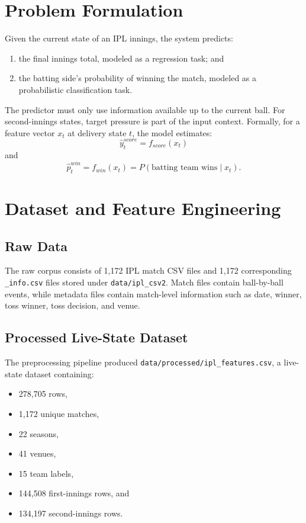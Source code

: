 \documentclass[conference]{IEEEtran}
\begin{document}
\section{Problem Formulation}
Given the current state of an IPL innings, the system predicts:
\begin{enumerate}
\item the final innings total, modeled as a regression task; and
\item the batting side's probability of winning the match, modeled as a probabilistic classification task.
\end{enumerate}

The predictor must only use information available up to the current ball. For second-innings states, target pressure is part of the input context. Formally, for a feature vector $x_t$ at delivery state $t$, the model estimates:
\begin{equation}
\hat{y}^{score}_t = f_{score}(x_t)
\end{equation}
and
\begin{equation}
\hat{p}^{win}_t = f_{win}(x_t) = P(\text{batting team wins} \mid x_t).
\end{equation}

\section{Dataset and Feature Engineering}
\subsection{Raw Data}
The raw corpus consists of 1,172 IPL match CSV files and 1,172 corresponding \texttt{\_info.csv} files stored under \texttt{data/ipl\_csv2}. Match files contain ball-by-ball events, while metadata files contain match-level information such as date, winner, toss winner, toss decision, and venue.

\subsection{Processed Live-State Dataset}
The preprocessing pipeline produced \texttt{data/processed/ipl\_features.csv}, a live-state dataset containing:
\begin{itemize}
\item 278,705 rows,
\item 1,172 unique matches,
\item 22 seasons,
\item 41 venues,
\item 15 team labels,
\item 144,508 first-innings rows, and
\item 134,197 second-innings rows.
\end{itemize}
\end{document}
